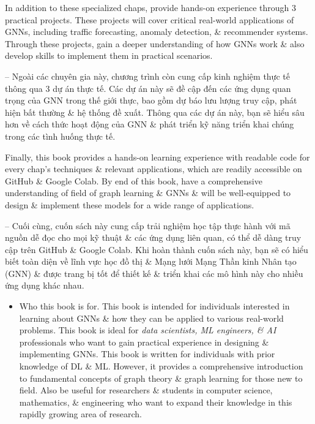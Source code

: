 \documentclass{article}
\begin{document}
\begin{itemize}
    In addition to these specialized chaps, provide hands-on experience through 3 practical projects. These projects will cover critical real-world applications of GNNs, including traffic forecasting, anomaly detection, \& recommender systems. Through these projects, gain a deeper understanding of how GNNs work \& also develop skills to implement them in practical scenarios.

    -- Ngoài các chuyên gia này, chương trình còn cung cấp kinh nghiệm thực tế thông qua 3 dự án thực tế. Các dự án này sẽ đề cập đến các ứng dụng quan trọng của GNN trong thế giới thực, bao gồm dự báo lưu lượng truy cập, phát hiện bất thường \& hệ thống đề xuất. Thông qua các dự án này, bạn sẽ hiểu sâu hơn về cách thức hoạt động của GNN \& phát triển kỹ năng triển khai chúng trong các tình huống thực tế.

    Finally, this book provides a hands-on learning experience with readable code for every chap's techniques \& relevant applications, which are readily accessible on GitHub \& Google Colab. By end of this book, have a comprehensive understanding of field of graph learning \& GNNs \& will be well-equipped to design \& implement these models for a wide range of applications.

    -- Cuối cùng, cuốn sách này cung cấp trải nghiệm học tập thực hành với mã nguồn dễ đọc cho mọi kỹ thuật \& các ứng dụng liên quan, có thể dễ dàng truy cập trên GitHub \& Google Colab. Khi hoàn thành cuốn sách này, bạn sẽ có hiểu biết toàn diện về lĩnh vực học đồ thị \& Mạng lưới Mạng Thần kinh Nhân tạo (GNN) \& được trang bị tốt để thiết kế \& triển khai các mô hình này cho nhiều ứng dụng khác nhau.
    \begin{itemize}
        \item {\sf Who this book is for.} This book is intended for individuals interested in learning about GNNs \& how they can be applied to various real-world problems. This book is ideal for {\it data scientists, ML engineers, \& AI} professionals who want to gain practical experience in designing \& implementing GNNs. This book is written for individuals with prior knowledge of DL \& ML. However, it provides a comprehensive introduction to fundamental concepts of graph theory \& graph learning for those new to field. Also be useful for researchers \& students in computer science, mathematics, \& engineering who want to expand their knowledge in this rapidly growing area of research.


\end{itemize}
\end{itemize}
\end{document}
